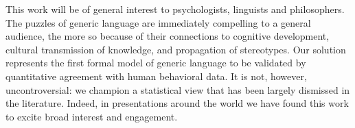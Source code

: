 \documentclass[11pt,stdletter,dateno,sigleft]{newlfm} %
\begin{document}
\begin{newlfm}
This work will be of general interest to psychologists, linguists and philosophers.
The puzzles of generic language are immediately compelling to a general audience, the more so because of their connections to cognitive development, cultural transmission of knowledge, and propagation of stereotypes.
Our solution represents the first formal model of generic language to be validated by quantitative agreement with human behavioral data.
It is not, however, uncontroversial: we champion a statistical view that has been largely dismissed in the literature.
Indeed, in presentations around the world we have found this work to excite broad interest and engagement.









%



\end{newlfm}
\end{document}
